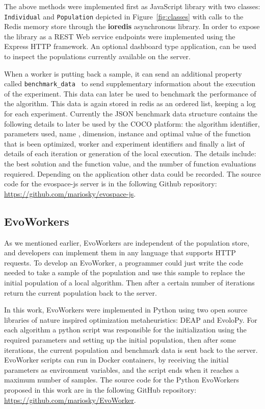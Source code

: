 The above methods were implemented first as JavaScript library 
with two classes: {\tt Individual} and {\tt Population} depicted 
in Figure~\ref{fig:classes} with calls to the Redis memory store 
through the {\bf ioredis} 
asynchronous library. In order to expose the library as a 
REST Web service endpoints were implemented using the Express HTTP framework. 
An optional dashboard type application, can be used to inspect 
the populations currently available on the server.


When a worker is putting back a sample, it can send 
an additional property called {\tt benchmark\_data }
to send supplementary information about the execution 
of the experiment.  This data can later be used to 
benchmark the performance of the algorithm. This 
data is again stored in redis as an ordered list, 
keeping a log for each experiment. Currently the JSON 
benchmark data structure contains the following details 
to later be used by the COCO platform: the algorithm identifier, 
parameters used, name , dimension, instance and optimal value 
of the function that is been optimized, worker and experiment 
identifiers and finally a list of details of each iteration 
or generation of the local execution. The details include:
the best solution and the function value, and the number of
function evaluations requiered. Depending on the application
other data could be recorded. The source code for the {\sf evospace-js}
server is in the following Github repository: 
\url{https://github.com/mariosky/evospace-js}.


\subsection{EvoWorkers}
\label{sec:evoworkers}
As we mentioned earlier, EvoWorkers are independent of 
the population store, and developers can implement them 
in any language that supports HTTP requests. To develop an 
EvoWorker, a programmer could just write the code needed to 
take a sample of the population and use this sample to 
replace the initial population of a local algorithm. 
Then after a certain number of iterations return the 
current population back to the server.

In this work, EvoWorkers were implemented in Python 
using two open source libraries of nature inspired optimization 
metaheuristics:  DEAP and EvoloPy. For each algorithm a 
python script was responsible for the initialization using 
the required parameters and setting up the initial population, 
then after some iterations, the current population and 
benchmark data is sent back to the server. EvoWorker 
scripts can run in Docker containers, by receiving 
the initial parameters as environment variables, and 
the script ends when it reaches a maximum number of samples.
The source code for the Python EvoWorkers
proposed in this work are in the following GitHub repository: 
\url{https://github.com/mariosky/EvoWorker}.

